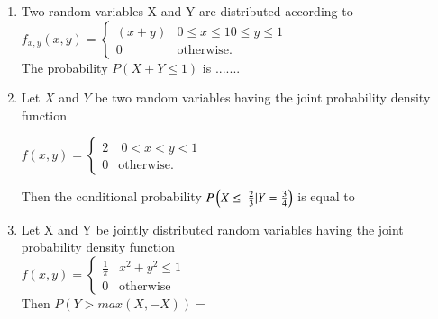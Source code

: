 \renewcommand{\theequation}{\theenumi}
\renewcommand{\thefigure}{\theenumi}
\renewcommand{\thetable}{\theenumi}
\begin{enumerate}[label=\thesection.\arabic*.,ref=\thesection.\theenumi]

\item Two random variables X and Y are distributed according to\\
{\centering $
f_{x,y}(x,y) = 
\begin{cases}
 (x+y) & 0 \leqslant x \leqslant 1   0 \leqslant y \leqslant 1 \\
 0 & \text{otherwise}.
 \end{cases}
 $ \\}
The probability $P(X+Y \leqslant 1)$ is .......
%

\item Let $X$ and $Y$ be two random variables having the joint probability density function

\begin{center}
$ 
f(x,y)=
\begin{cases}
2 &  \ 0<x<y<1 \\
0 & \text{otherwise}.
\end{cases}
$\\ 
\end{center}

Then the conditional probability $P \left(X \leq\ \frac{2}{3} | Y=\frac{3}{4}\right)$ is equal to \underline{\hspace{3cm}}

\begin{enumerate}
\end{enumerate}

\item Let X and Y be jointly distributed random variables having the joint probability density function \\
$
f(x,y) = 
\begin{cases} 
\frac{1}{\pi} 
&  x^2+y^2 \leqslant 1 \\
0 & \text{otherwise}
\end{cases}
$ \\
Then $P(Y>max(X,-X))=$


\end{enumerate}
